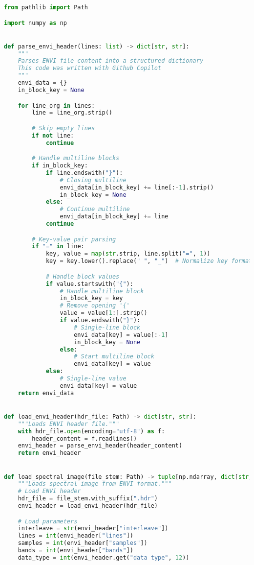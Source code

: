 \begin{lstlisting}[language=python, caption=Load ENVI format images, label={code:load-envi}]
from pathlib import Path

import numpy as np


def parse_envi_header(lines: list) -> dict[str, str]:
    """
    Parses ENVI file content into a structured dictionary
    This code was written with Github Copilot
    """
    envi_data = {}
    in_block_key = None

    for line_org in lines:
        line = line_org.strip()

        # Skip empty lines
        if not line:
            continue

        # Handle multiline blocks
        if in_block_key:
            if line.endswith("}"):
                # Closing multiline
                envi_data[in_block_key] += line[:-1].strip()
                in_block_key = None
            else:
                # Continue multiline
                envi_data[in_block_key] += line
            continue

        # Key-value pair parsing
        if "=" in line:
            key, value = map(str.strip, line.split("=", 1))
            key = key.lower().replace(" ", "_")  # Normalize key format

            # Handle block values
            if value.startswith("{"):
                # Handle multiline block
                in_block_key = key
                # Remove opening '{'
                value = value[1:].strip()
                if value.endswith("}"):
                    # Single-line block
                    envi_data[key] = value[:-1]
                    in_block_key = None
                else:
                    # Start multiline block
                    envi_data[key] = value
            else:
                # Single-line value
                envi_data[key] = value
    return envi_data


def load_envi_header(hdr_file: Path) -> dict[str, str]:
    """Loads ENVI header file."""
    with hdr_file.open(encoding="utf-8") as f:
        header_content = f.readlines()
    envi_header = parse_envi_header(header_content)
    return envi_header


def load_spectral_image(file_stem: Path) -> tuple[np.ndarray, dict[str, str]]:
    """Loads spectral image from ENVI format."""
    # Load ENVI header
    hdr_file = file_stem.with_suffix(".hdr")
    envi_header = load_envi_header(hdr_file)

    # Load parameters
    interleave = str(envi_header["interleave"])
    lines = int(envi_header["lines"])
    samples = int(envi_header["samples"])
    bands = int(envi_header["bands"])
    data_type = int(envi_header.get("data type", 12))


\end{lstlisting}
